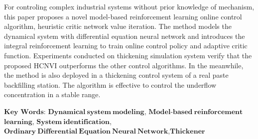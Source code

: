 
For controling complex industrial systems without prior knowledge of mechanism, this paper proposes a novel
model-based reinforcement learning online control algorithm, heuristic critic network value iteration.
The method models the dynamical system with differential equation neural network and introduces the integral reinforcement learning to train online control policy and adaptive critic function.
Experiments conducted on thickening simulation system verify that the proposed HCNVI outperforms the other control algorithms.
In the meanwhile, the method is also deployed in a thickening control system of a real paste backfilling station.
The algorithm is effective to control the underflow concentration in a stable range.


\vskip 30bp
{
    $\mathbf{Key}$ $\mathbf{Words}$: 
    $\mathbf{Dynamical\ system\ modeling}$, 
    $\mathbf{Model}$-$\mathbf{based\ reinforcement}$
    $\mathbf{learning}$,
    $\mathbf{System\ identification}$, 
    $\mathbf{Ordinary\ Differential\ Equation\ Neural\ Network}$,$\mathbf{Thickener}$
    
}

